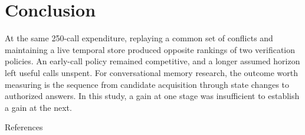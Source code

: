 \documentclass[
  11pt,
]{article}
\begin{document}
\section{Conclusion}\label{conclusion}

At the same 250-call expenditure, replaying a common set of conflicts
and maintaining a live temporal store produced opposite rankings of two
verification policies. An early-call policy remained competitive, and a
longer assumed horizon left useful calls unspent. For conversational
memory research, the outcome worth measuring is the sequence from
candidate acquisition through state changes to authorized answers. In
this study, a gain at one stage was insufficient to establish a gain at
the next.

References

\protect{}\label{refs}
\end{document}
